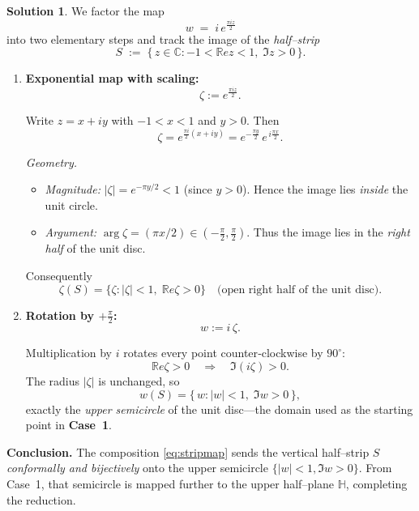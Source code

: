 \documentclass[12pt]{article}
\theoremstyle{definition} %
\newtheorem{solution}{Solution}
\theoremstyle{plain} %
\begin{document}
\begin{solution}
  We factor the map
  \[
     w \;=\; i\,e^{\frac{\pi i z}{2}}
  \tag{$\ast$}\label{eq:stripmap}
  \]
  into two elementary steps and track the image of the
  \emph{half–strip}
  \[
     S \;:=\;\{\,z\in\mathbb{C} : -1<\mathbb{R}e z<1,\; \Im z>0\,\}.
  \]
  
  \begin{enumerate}[label=\textbf{Step~\arabic*.},wide,labelwidth=!,labelindent=0pt]
  
  \item \textbf{Exponential map with scaling:}
        \[
           \zeta := e^{\frac{\pi i z}{2}}.
        \]
  
        Write $z=x+iy$ with $-1<x<1$ and $y>0$.
        Then
        \[
           \zeta
           = e^{\frac{\pi i}{2}(x+iy)}
           = e^{-\frac{\pi y}{2}}\,
             e^{\,i\frac{\pi x}{2}}.
        \]
  
        \emph{Geometry.}
        \begin{itemize}
          \item \emph{Magnitude:} $|\zeta| = e^{-\pi y/2}<1$  
                (since $y>0$).  Hence the image lies \emph{inside} the
                unit circle.
          \item \emph{Argument:} $\arg\zeta = (\pi x/2)\in(-\tfrac{\pi}{2},
                \tfrac{\pi}{2})$.  
                Thus the image lies in the \emph{right half} of the unit disc.
        \end{itemize}
  
        Consequently
        \[
          \zeta(S)
          = \bigl\{\zeta : |\zeta|<1,\; \mathbb{R}e\zeta>0\bigr\}
          \quad
          \text{(open right half of the unit disc).}
        \]
  
  \item \textbf{Rotation by \boldmath$+\tfrac{\pi}{2}$:}
        \[
           w := i\,\zeta.
        \]
  
        Multiplication by $i$ rotates every point
        counter‑clockwise by $90^{\circ}$:
        \[
           \mathbb{R}e\zeta>0
           \quad\Longrightarrow\quad
           \Im(i\zeta)>0.
        \]
        The radius $|\zeta|$ is unchanged, so
        \[
           w(S)
           = \bigl\{\,w : |w|<1,\; \Im w>0\,\bigr\},
        \]
        exactly the \emph{upper semicircle} of the unit disc—the domain
        used as the starting point in \textbf{Case 1}.
  
  \end{enumerate}
  
  \bigskip
  \textbf{Conclusion.}
  The composition \eqref{eq:stripmap} sends the vertical half–strip $S$
  \emph{conformally and bijectively} onto the upper semicircle
  $\{|w|<1,\Im w>0\}$.
  From Case 1, that semicircle is mapped further to the upper half–plane
  $\mathbb{H}$, completing the reduction.
  
  \end{solution}
\end{document}
